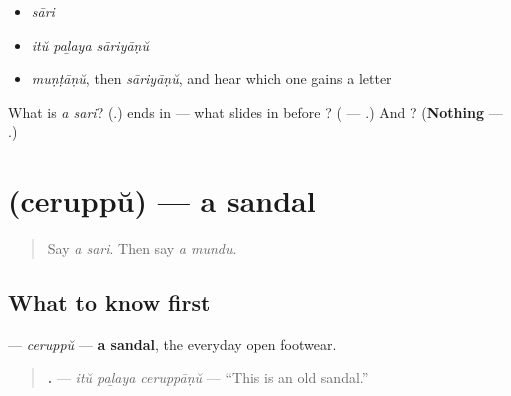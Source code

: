 \begin{itemize}
\raggedright
  \item \emph{sāri}
  \item \emph{itŭ paḻaya sāriyāṇŭ}
  \item \emph{muṇṭāṇŭ}, then \emph{sāriyāṇŭ}, and hear which one gains a letter
\end{itemize}

\begin{tcolorbox}[breakable,colback=teal!4,colframe=teal!35!black,title={Before you move on}]
What is \emph{a sari}? (\textbf{}.) \textbf{} ends in \textbf{} — what slides in before \textbf{}? (\textbf{} — \textbf{}.) And \textbf{}? (\textbf{Nothing} — \textbf{}.)
\end{tcolorbox}
\section[\texorpdfstring{\ml{ചെരുപ്പ്} (ceruppŭ)}{ചെരുപ്പ് (ceruppŭ)}]{ (ceruppŭ) — a sandal}

\label{lesson:ML-C100-cheruppu}



\begin{quote}
Say \emph{a sari}. Then say \emph{a mundu}.
\end{quote}

\subsection*{What to know first}
\textbf{} — \emph{ceruppŭ} — \textbf{a sandal}, the everyday open footwear.

\begin{quote}
\textbf{  .} — \emph{itŭ paḻaya ceruppāṇŭ} — \textquotedblleft{}This is an old sandal.\textquotedblright{}
\end{quote}

